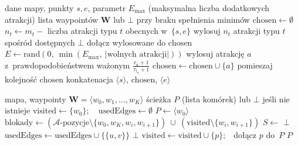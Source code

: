\begin{algorithm}[H]
\caption{\textsc{LosoweWaypointy} --- losowanie planu atrakcji}
\label{alg:random-waypoints}
\begin{algorithmic}[1]
\Require dane mapy, punkty $s, e$, parametr $E_{\max}$ (maksymalna liczba dodatkowych atrakcji)
\Ensure lista waypointów $\mathbf{W}$ lub $\bot$ przy braku spełnienia minimów
\State $\mathrm{chosen} \gets \emptyset$
    \State $n_t \gets m_t -$ liczba atrakcji typu $t$ obecnych w~$\{s, e\}$
        \State wylosuj $n_t$ atrakcji typu $t$ spośród dostępnych
         \State \Return $\bot$ \EndIf
        \State dołącz wylosowane do $\mathrm{chosen}$
    \EndIf
\EndFor
\State $E \gets \mathrm{rand}\!\left(0,\ \min(E_{\max},\ |\text{wolnych atrakcji}|)\right)$
    \State wylosuj atrakcję $a$ z~prawdopodobieństwem ważonym
           $\frac{v_a + 1}{\tau_{t_a} + 1}$
        \State $\mathrm{chosen} \gets \mathrm{chosen} \cup \{a\}$
    \EndIf
\EndFor
\State pomieszaj kolejność $\mathrm{chosen}$
\State \Return konkatenacja $\langle s \rangle$, $\mathrm{chosen}$, $\langle e \rangle$
\end{algorithmic}
\end{algorithm}

\begin{algorithm}[H]
\caption{\textsc{BudujSciezkeZWaypointow} --- konstrukcja ścieżki fizycznej}
\label{alg:build-path}
\begin{algorithmic}[1]
\Require mapa, waypointy $\mathbf{W} = \langle w_0, w_1, \dots, w_K \rangle$
\Ensure ścieżka $P$ (lista komórek) lub $\bot$ jeśli nie istnieje
\State $\mathrm{visited} \gets \{w_0\};\quad \mathrm{usedEdges} \gets \emptyset$
\State $P \gets \langle w_0 \rangle$
    \State $\text{blokady} \gets (\mathcal{A}\text{-pozycje} \setminus \{w_0, w_K, w_i, w_{i+1}\})\ \cup\ (\mathrm{visited} \setminus \{w_i, w_{i+1}\})$
    \State $S \gets$ 
     \Return $\bot$ \EndIf
        \State $\mathrm{usedEdges} \gets \mathrm{usedEdges} \cup \{\{u,v\}\}$
    \EndFor
         \Return $\bot$ \EndIf
        \State $\mathrm{visited} \gets \mathrm{visited} \cup \{p\}$;\ \  dołącz $p$ do~$P$
    \EndFor
\EndFor
\State \Return $P$
\end{algorithmic}
\end{algorithm}

